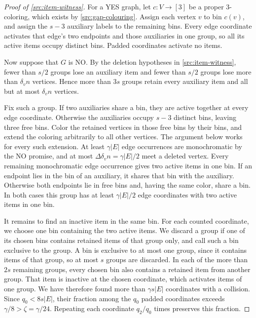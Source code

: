 \documentclass[11pt,letterpaper]{article} \usepackage[utf8]{inputenc}
\theoremstyle{plain} \newtheorem{theorem}{Theorem}[section]
\theoremstyle{definition} \newaliascnt{definition}{theorem}
\begin{document}
\begin{proof}[Proof of \cref{src:item-witness}]
\label{proof:src:item-witness}
For a YES graph, let \(c:V\to[3]\) be a proper $3$-coloring, which exists by
\cref{src:gap-colouring}. Assign each vertex \(v\) to bin \(c(v)\), and assign
the \(s-3\) auxiliary labels to the remaining bins. Every edge coordinate
activates that edge's two endpoints and those auxiliaries in one group, so all
its active items occupy distinct bins. Padded coordinates activate no items.

Now suppose that \(G\) is NO. By the deletion hypotheses in
\cref{src:item-witness}, fewer than \(s/2\) groups lose an auxiliary item and
fewer than \(s/2\) groups lose more than \(\delta_v n\) vertices. Hence more
than \(3s\) groups retain every auxiliary item and all but at most \(\delta_v
n\) vertices.

Fix such a group. If two auxiliaries share a bin, they are active together at every
edge coordinate. Otherwise the auxiliaries occupy \(s-3\) distinct bins,
leaving three free bins. Color the retained vertices in those free bins by
their bins, and extend the coloring arbitrarily to all other vertices. The
argument below works for every such extension.
At least \(\gamma|E|\) edge occurrences are monochromatic by the NO promise,
and at most \(\Delta\delta_v n=\gamma|E|/2\) meet a deleted vertex.
Every remaining monochromatic edge occurrence gives two active items in one bin.
If an endpoint lies in the bin of an auxiliary, it shares that bin with the auxiliary.
Otherwise both endpoints lie in free bins and, having the same color, share a bin.
In both cases this group has
at least \(\gamma|E|/2\) edge coordinates with two active items in one bin.

It remains to find an inactive item in the same bin. For each counted
coordinate, we choose one bin containing the two active items.
We discard a group if one of its chosen bins contains retained items of that
group only, and call such a bin exclusive to the group. A bin is exclusive to at most
one group, since it contains items of that group, so at most \(s\) groups are discarded.
In each of the more than \(2s\) remaining groups, every chosen
bin also contains a retained item from another group. That item is inactive
at the chosen coordinate, which activates items of one group. We have therefore found more than
\(\gamma s|E|\) coordinates with a collision.
Since \(q_0<8s|E|\), their fraction among the \(q_0\) padded coordinates exceeds
\(\gamma/8>\zeta=\gamma/24\). Repeating each coordinate \(q_2/q_0\) times
preserves this fraction.
\end{proof}
\end{document}
